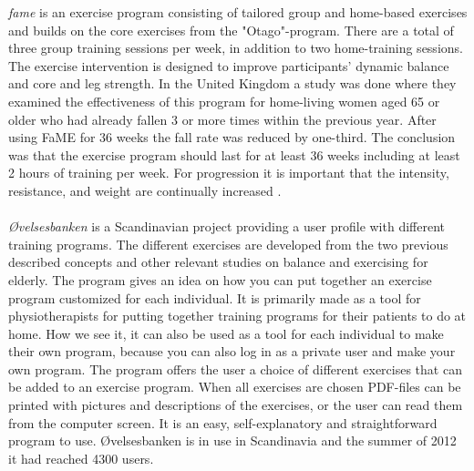\emph{\ac{fame}} is an exercise program consisting of tailored group and home-based exercises and builds on the core exercises from the "Otago"-program.  There are a total of three group training sessions per week, in addition to two home-training sessions. The exercise intervention is designed to improve participants' dynamic balance and core and leg strength.  In the United Kingdom a study was done where they examined the effectiveness of this program for home-living women aged 65 or older who had already fallen 3 or more times within the previous year. After using FaME for 36 weeks the fall rate was reduced by one-third. The conclusion was that the exercise program should last for at least 36 weeks including at least 2 hours of training per week. For progression it is important that the intensity, resistance, and weight are continually increased \cite{fame}.\\ \\
\emph{{Ø}velsesbanken} is a Scandinavian project providing a user profile with different training programs. The different exercises are developed from the two previous described concepts and other relevant studies on balance and exercising for elderly. The program gives an idea on how you can put together an exercise program customized for each individual. It is primarily made as a tool for physiotherapists for putting together training programs for their patients to do at home. How we see it, it can also be used as a tool for each individual to make their own program, because you can also log in as a private user and make your own program. The program offers the user a choice of different exercises that can be added to an exercise program. When all exercises are chosen PDF-files can be printed with pictures and descriptions of the exercises, or the user can read them from the computer screen. It is an easy, self-explanatory and straightforward program to use. {Ø}velsesbanken is in use in Scandinavia and the summer of 2012 it had reached 4300 users. \cite{ovelsesbank}\\ \\
